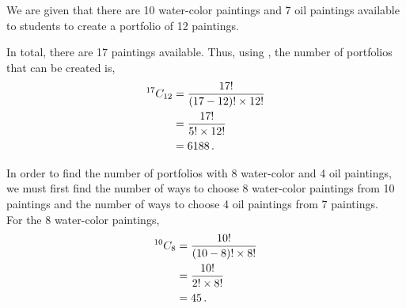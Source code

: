 %
%


\begin{subquestions}
	
\subquestion

We are given that there are 10 water-color paintings and 7 oil paintings available to students to create a portfolio of 12 paintings.	
	
\begin{subsubquestions}
	
\subsubquestion

In total, there are 17 paintings available. Thus, using , the number of portfolios that can be created is,
\begin{align}
	^{17}C_{12} & = \frac{17!}{(17-12)! \times 12!} \nonumber \\
	            & = \frac{17!}{5! \times 12!} \nonumber \\
	            & = 6188 \,.
\end{align}
	
	
\subsubquestion 

In order to find the number of portfolios with 8 water-color and 4 oil paintings, we must first find the number of ways to choose 8 water-color paintings from 10 paintings and the number of ways to choose 4 oil paintings from 7 paintings. \\

For the 8 water-color paintings,
\begin{align}
	^{10}C_{8} & = \frac{10!}{(10-8)! \times 8!} \nonumber \\
	           & = \frac{10!}{2! \times 8!} \nonumber \\
	           & = 45 \,.
\end{align}


\end{subsubquestions}
\end{subquestions}

